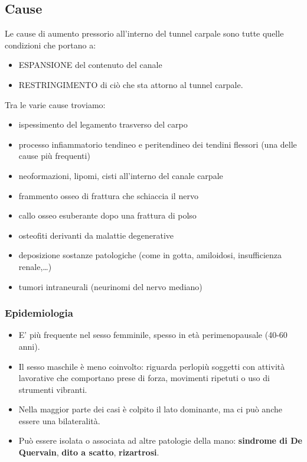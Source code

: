 \subsection{Cause}

Le cause di aumento pressorio all'interno del tunnel carpale sono tutte quelle condizioni che portano a:

\begin{itemize}
\item
  ESPANSIONE del contenuto del canale
\item
  RESTRINGIMENTO di ciò che sta attorno al tunnel carpale.
\end{itemize}

Tra le varie cause troviamo:

\begin{itemize}
\item
  ispessimento del legamento trasverso del carpo
\item
  processo infiammatorio tendineo e peritendineo dei tendini flessori (una delle cause più frequenti)
\item
  neoformazioni, lipomi, cisti all'interno del canale carpale
\item
  frammento osseo di frattura che schiaccia il nervo
\item
  callo osseo esuberante dopo una frattura di polso
\item
  osteofiti derivanti da malattie degenerative
\item
  deposizione sostanze patologiche (come in gotta, amiloidosi, insufficienza renale,\ldots{})
\item
  tumori intraneurali (neurinomi del nervo mediano)
\end{itemize}

\subsubsection{Epidemiologia}

\begin{itemize}
\item
  E' più frequente nel sesso femminile, spesso in età perimenopausale (40-60 anni).
\item
  Il sesso maschile è meno coinvolto: riguarda perlopiù soggetti con attività lavorative che comportano prese di forza, movimenti ripetuti o uso di strumenti vibranti.
\item
  Nella maggior parte dei casi è colpito il lato dominante, ma ci può anche essere una bilateralità.
\item
  Può essere isolata o associata ad altre patologie della mano: \textbf{sindrome di De Quervain}, \textbf{dito a scatto}, \textbf{rizartrosi}.
\end{itemize}

